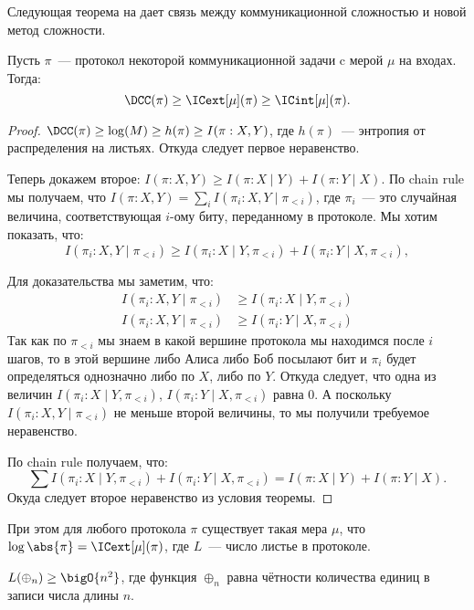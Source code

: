 Следующая теорема на дает связь между коммуникационной сложностью и новой метод сложности.

\begin{theorem}
    Пусть $\pi$~--- протокол некоторой коммуникационной задачи c мерой $\mu$ на входах. Тогда:
    $$
        \DCC(\pi) \ge \ICext[\mu](\pi) \ge \ICint[\mu](\pi).
    $$ 
\end{theorem}

\begin{proof}
    $\DCC(\pi) \ge \log(M) \ge h(\pi) \ge I(\pi : X, Y)$, где $h(\pi)$~--- энтропия от распределения на
    листьях. Откуда следует первое неравенство.
    
    Теперь докажем второе: $I(\pi : X, Y) \ge I(\pi : X \mid Y) + I(\pi : Y \mid X)$. По chain rule мы
    получаем, что $I(\pi : X, Y) = \sum\limits_i I(\pi_i : X, Y \mid \pi_{< i})$, где $\pi_i$~--- это
    случайная величина, соответствующая $i$-ому биту, переданному в протоколе. Мы хотим показать, что:
    $$
        I(\pi_i : X, Y \mid \pi_{< i}) \ge I(\pi_i : X \mid Y, \pi_{< i}) +
        I(\pi_i : Y \mid X, \pi_{< i}),
    $$

    Для доказательства мы заметим, что:
    \begin{align*}
      I(\pi_i : X, Y \mid \pi_{< i}) &\ge I(\pi_i : X \mid Y, \pi_{< i}) \\
      I(\pi_i : X, Y \mid \pi_{< i}) &\ge I(\pi_i : Y \mid X, \pi_{< i})
    \end{align*}
    Так как по $\pi_{< i}$ мы знаем в какой вершине протокола мы находимся после $i$ шагов, то в этой
    вершине либо Алиса либо Боб посылают бит и $\pi_i$ будет определяться однозначно либо по $X$, либо по
    $Y$. Откуда следует, что одна из величин $I(\pi_i : X \mid Y, \pi_{< i})$, $I(\pi_i : Y \mid X,
    \pi_{< i})$ равна $0$. А поскольку $I(\pi_i : X, Y \mid \pi_{< i})$ не меньше второй величины, то мы
    получили требуемое неравенство.

    По chain rule получаем, что:
    $$
        \sum I(\pi_i : X \mid Y, \pi_{< i}) + I(\pi_i : Y \mid X, \pi_{< i}) =
        I(\pi : X \mid Y) + I(\pi : Y \mid X).
    $$ 
    Окуда следует второе неравенство из условия теоремы.
\end{proof}

При этом  для любого протокола $\pi$ существует такая мера $\mu$, что $\log \abs{\pi} = \ICext[\mu](\pi)$,
где $L$~--- число листье в протоколе.

\begin{theorem}[Храпченко]
    $L(\oplus_n) \ge \bigO{n^2}$, где функция $\oplus_n$ равна чётности количества единиц в записи числа
    длины $n$.
\end{theorem}

